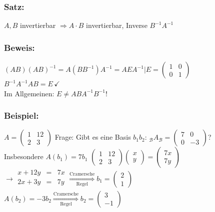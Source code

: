 \subsubsection{Satz:}
$A,B$ invertierbar $\Rightarrow A \cdot B$ invertierbar, Inverse $B^{-1}A^{-1}$
%
%
%
\subsubsection{Beweis:}
$(AB)(AB)^{-1}=A(BB^{-1})A^{-1}=AEA^{-1}|E=\begin{pmatrix}1 & 0 \\ 0 &1 \end{pmatrix}$\\
$B^{-1}A^{-1}AB=E \, \checkmark$\\
Im Allgemeinen: $E \neq ABA^{-1}B^{-1}$!
%
%
%
\subsubsection{Beispiel:}
$A=\begin{pmatrix} 1 & 12 \\ 2 & 3 \end{pmatrix}$ Frage: Gibt es eine Basis $b_{1}b_{2}: \,  _{\mathcal{B}}A_{\mathcal{B}} = \begin{pmatrix} 7 & 0 \\ 0 & -3 \end{pmatrix}$? \\
Insbesondere $A(b_{1})=7b_{1}$  $\begin{pmatrix}1 & 12 \\ 2 & 3 \end{pmatrix} \begin{pmatrix} x \\ y \end{pmatrix} = \begin{pmatrix} 7x \\ 7y \end{pmatrix}$ \\
$\rightarrow
\begin{array}{rcr}
x + 12y &=& 7x\\
2x + 3y &=& 7y\\
\end{array}
\mathop{\Rightarrow}\limits^{\text{Cramersche}}_{\text{Regel}} b_{1} = \begin{pmatrix} 2 \\ 1 \end{pmatrix}$\\
$A(b_{2}) = -3b_{2} \mathop{\Rightarrow}\limits^{\text{Cramersche}}_{\text{Regel}} b_{2} = \begin{pmatrix} 3 \\ -1 \end{pmatrix}$\\
%
%
%
